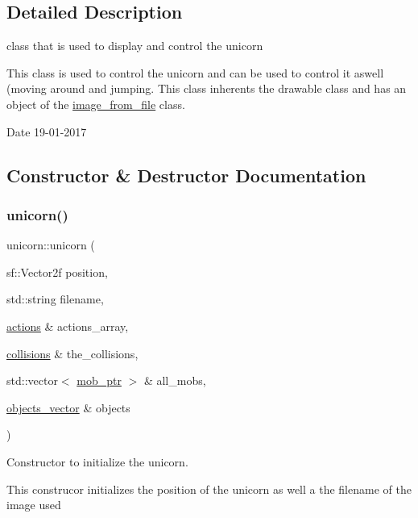 \subsection{Detailed Description}
class that is used to display and control the unicorn 

This class is used to control the unicorn and can be used to control it aswell (moving around and jumping. This class inherents the drawable class and has an object of the \hyperlink{classimage__from__file}{image\+\_\+from\+\_\+file} class.

\begin{DoxyDate}{Date}
19-\/01-\/2017 
\end{DoxyDate}


\subsection{Constructor \& Destructor Documentation}
\mbox{\label{classunicorn_a5106a69c85e9426caf0bc79f48c21ed4}} 
\subsubsection{\texorpdfstring{unicorn()}{unicorn()}}
{\footnotesize\ttfamily unicorn\+::unicorn (\begin{DoxyParamCaption}\item[{sf\+::\+Vector2f}]{position,  }\item[{std\+::string}]{filename,  }\item[{\hyperlink{drawable_8hpp_a38f93e4749e0d65d51360c429766d212}{actions} \&}]{actions\+\_\+array,  }\item[{\hyperlink{drawable_8hpp_a7e1a7f34f6d09dabb4cdafd6e4118603}{collisions} \&}]{the\+\_\+collisions,  }\item[{std\+::vector$<$ \hyperlink{npc_8hpp_a09ee7f853fc9bc830a9445a06fd53d4b}{mob\+\_\+ptr} $>$ \&}]{all\+\_\+mobs,  }\item[{\hyperlink{drawable_8hpp_a6c0fdb1dfd0c34dbbdbb5dcd3c608b07}{objects\+\_\+vector} \&}]{objects }\end{DoxyParamCaption})}



Constructor to initialize the unicorn. 

This construcor initializes the position of the unicorn as well a the filename of the image used


